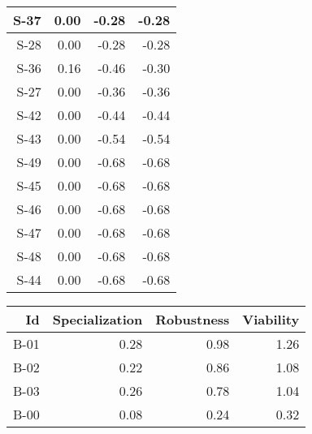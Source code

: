\begin{tabular}{ | r | r | r | r | }
    \hline
                  S-37  &            0.00  &           -0.28  &           -0.28  \\
    \hline
                  S-28  &            0.00  &           -0.28  &           -0.28  \\
    \hline
                  S-36  &            0.16  &           -0.46  &           -0.30  \\
    \hline
                  S-27  &            0.00  &           -0.36  &           -0.36  \\
    \hline
                  S-42  &            0.00  &           -0.44  &           -0.44  \\
    \hline
                  S-43  &            0.00  &           -0.54  &           -0.54  \\
    \hline
                  S-49  &            0.00  &           -0.68  &           -0.68  \\
    \hline
                  S-45  &            0.00  &           -0.68  &           -0.68  \\
    \hline
                  S-46  &            0.00  &           -0.68  &           -0.68  \\
    \hline
                  S-47  &            0.00  &           -0.68  &           -0.68  \\
    \hline
                  S-48  &            0.00  &           -0.68  &           -0.68  \\
    \hline
                  S-44  &            0.00  &           -0.68  &           -0.68  \\
    \hline
\end{tabular}


\begin{tabular}{ | r | r | r | r | }
    \hline
                    Id  &  Specialization  &      Robustness  &       Viability  \\
    \hline
    \hline
                  B-01  &            0.28  &            0.98  &            1.26  \\
    \hline
                  B-02  &            0.22  &            0.86  &            1.08  \\
    \hline
                  B-03  &            0.26  &            0.78  &            1.04  \\
    \hline
                  B-00  &            0.08  &            0.24  &            0.32  \\
    \hline
\end{tabular}


